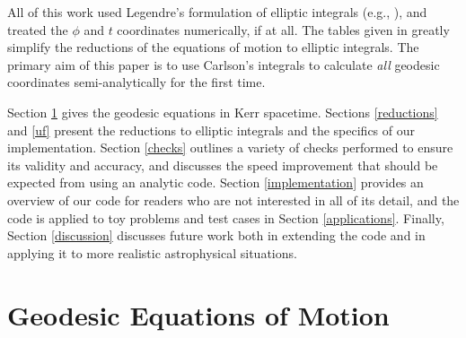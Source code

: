 \documentclass[apj]{emulateapj}
\begin{document}
All of this work used Legendre's formulation of elliptic integrals (e.g., \citealt{abramstegun}), and treated the $\phi$ and $t$ coordinates numerically, if at all. The tables given in \citet{carlsonQUART,carlson89,carlson91,carlsonDOUBLE} greatly simplify the reductions of the equations of motion to elliptic integrals. The primary aim of this paper is to use Carlson's integrals to calculate {\it all} geodesic coordinates semi-analytically for the first time.



Section \ref{EOM} gives the geodesic equations in Kerr spacetime. Sections \ref{reductions} and \ref{uf} present the reductions to elliptic integrals and the specifics of our implementation. Section \ref{checks} outlines a variety of checks performed to ensure its validity and accuracy, and discusses the speed improvement that should be expected from using an analytic code. Section \ref{implementation} provides an overview of our code for readers who are not interested in all of its detail, and the code is applied to toy problems and test cases in Section \ref{applications}. Finally, Section \ref{discussion} discusses future work both in extending the code and in applying it to more realistic astrophysical situations.

\section{Geodesic Equations of Motion}
\label{EOM}
 
\end{document}
